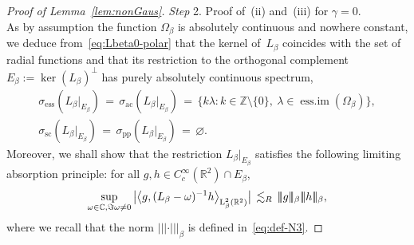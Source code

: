 \documentclass[a4paper,11pt,reqno,noindent]{amsart}
\theoremstyle{plain}
\numberwithin{equation}{section}
\newcommand{\R}{\mathbb R}
\newcommand{\Z}{\mathbb Z}
\newcommand{\C}{\mathbb C}
\newcommand{\3}{|\!|\!|}
\newcommand{\Ld}{\operatorname{L}}
\newcommand{\step}[1]{\noindent \textit{Step} #1.}
\begin{document}
\begin{proof}[Proof of Lemma~\ref{lem:nonGaus}]
\medskip
\step2 Proof of~(ii) and~(iii) for $\gamma=0$.\\
As by assumption the function $\Omega_\beta$ is absolutely continuous and nowhere constant, we deduce from~\eqref{eq:Lbeta0-polar} that the kernel of~$L_\beta$ coincides with the set of radial functions and that its restriction to the orthogonal complement $E_\beta:=\ker(L_\beta)^\bot$ has purely absolutely continuous spectrum,
\begin{gather*}
\sigma_{\operatorname{ess}}(L_\beta|_{E_\beta})\,=\,\sigma_{\operatorname{ac}}(L_\beta|_{E_\beta})\,=\,\big\{k\lambda:k\in\Z\setminus\{0\},~\lambda\in\operatorname{ess.im}(\Omega_\beta)\big\},\\
\sigma_{\operatorname{sc}}(L_\beta|_{E_\beta})\,=\,\sigma_{\operatorname{pp}}(L_\beta|_{E_\beta})\,=\,\varnothing.
\end{gather*}
Moreover, we shall show that the restriction $L_\beta|_{E_\beta}$ satisfies the following limiting absorption principle: for all $g,h\in C^\infty_c(\R^2)\cap E_\beta$,
\begin{equation}\label{eq:LAP-0}
\sup_{\omega\in\C,\Im\omega\ne0}\big|\big\langle g,(L_\beta-\omega)^{-1}h\big\rangle_{\Ld^2_\beta(\R^2)}\big|\\
\,\lesssim_R\,
\3g\3_\beta\3h\3_\beta,
\end{equation}
where we recall that the norm $\3\cdot\3_\beta$ is defined in~\eqref{eq:def-N3}.


\end{proof}
\end{document}
